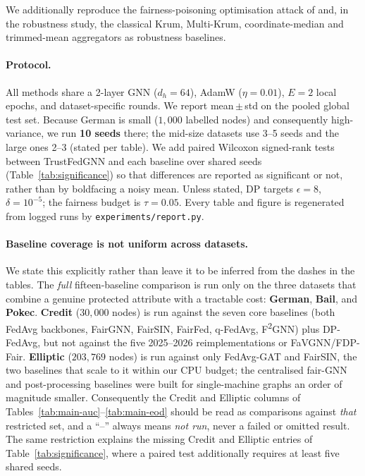 \documentclass[pdflatex,sn-mathphys-num]{sn-jnl}
\theoremstyle{thmstyleone}%
\theoremstyle{thmstyletwo}%
\theoremstyle{thmstylethree}%
\begin{document}
We additionally reproduce the fairness-poisoning optimisation attack of
\cite{kasyap2025attack} and, in the robustness study, the classical Krum,
Multi-Krum, coordinate-median and trimmed-mean aggregators
\cite{blanchard2017krum,yin2018byzantine} as robustness baselines.

\paragraph{Protocol.}
All methods share a 2-layer GNN ($d_h{=}64$), AdamW ($\eta{=}0.01$), $E{=}2$
local epochs, and dataset-specific rounds. We report mean\,$\pm$\,std on the
pooled global test set. Because German is small ($1{,}000$ labelled nodes) and
consequently high-variance, we run \textbf{10 seeds} there; the mid-size
datasets use 3--5 seeds and the large ones 2--3 (stated per table). We add
paired Wilcoxon signed-rank tests between TrustFedGNN and each baseline over
shared seeds (Table~\ref{tab:significance}) so that differences are reported as
significant or not, rather than by boldfacing a noisy mean. Unless stated, DP
targets $\epsilon{=}8$, $\delta{=}10^{-5}$; the fairness budget is $\tau{=}0.05$.
Every table and figure is regenerated from logged runs by
\texttt{experiments/report.py}.

\paragraph{Baseline coverage is not uniform across datasets.}
We state this explicitly rather than leave it to be inferred from the dashes in
the tables. The \emph{full} fifteen-baseline comparison is run only on the three
datasets that combine a genuine protected attribute with a tractable cost:
\textbf{German}, \textbf{Bail}, and \textbf{Pokec}. \textbf{Credit} ($30{,}000$
nodes) is run against the seven core baselines (both FedAvg backbones, FairGNN,
FairSIN, FairFed, q-FedAvg, F\textsuperscript{2}GNN) plus DP-FedAvg, but not
against the five 2025--2026 reimplementations or FaVGNN/FDP-Fair.
\textbf{Elliptic} ($203{,}769$ nodes) is run against only FedAvg-GAT and
FairSIN, the two baselines that scale to it within our CPU budget; the
centralised fair-GNN and post-processing baselines were built for
single-machine graphs an order of magnitude smaller. Consequently the Credit
and Elliptic columns of Tables~\ref{tab:main-auc}--\ref{tab:main-eod} should be
read as comparisons against \emph{that} restricted set, and a ``--'' always
means \emph{not run}, never a failed or omitted result. The same restriction
explains the missing Credit and Elliptic entries of
Table~\ref{tab:significance}, where a paired test additionally requires at
least five shared seeds.
\end{document}
